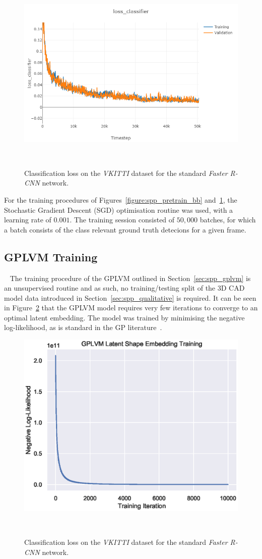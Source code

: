 \begin{figure}[!htbp]
  \centering
  \includegraphics[width=.6\linewidth]{figures/spp/quant/rcnn_pretrain/cls.png}
  \caption[VKITTI Classification Training]{Classification loss on the \textit{VKITTI} 
  dataset for the standard \textit{Faster R-CNN} network.}
~\label{figure:spp_pretrain_cls}
\end{figure}

For the training procedures of Figures~\ref{figure:spp_pretrain_bb} and~\ref{figure:spp_pretrain_cls}, the Stochastic Gradient 
Descent (SGD) optimisation routine was used, with a learning rate of \( 0.001 \). The training session consisted of \(50,000\) 
batches, for which a batch consists of the class relevant ground truth detecions for a given frame.

\subsection{GPLVM Training}
~\label{sec:spp_quantitative_gp_train}
The training procedure of the GPLVM outlined in Section~\ref{sec:spp_gplvm} is an unsupervised routine and as such, 
no training/testing split of the 3D CAD model data introduced in Section~\ref{sec:spp_qualitative} is required. It 
can be seen in Figure~\ref{figure:spp_gplvm_train} that the GPLVM model requires very few iterations to converge to 
an optimal latent embedding. The model was trained by minimising the negative log-likelihood, as is standard in 
the GP literature~\cite{GPML}.

\begin{figure}[!htbp]
  \centering
  \includegraphics[width=.6\linewidth]{figures/spp/quant/gp_train.eps}
  \caption[VKITTI Classification Training]{Classification loss on the \textit{VKITTI} 
  dataset for the standard \textit{Faster R-CNN} network.}
~\label{figure:spp_gplvm_train}
\end{figure}


